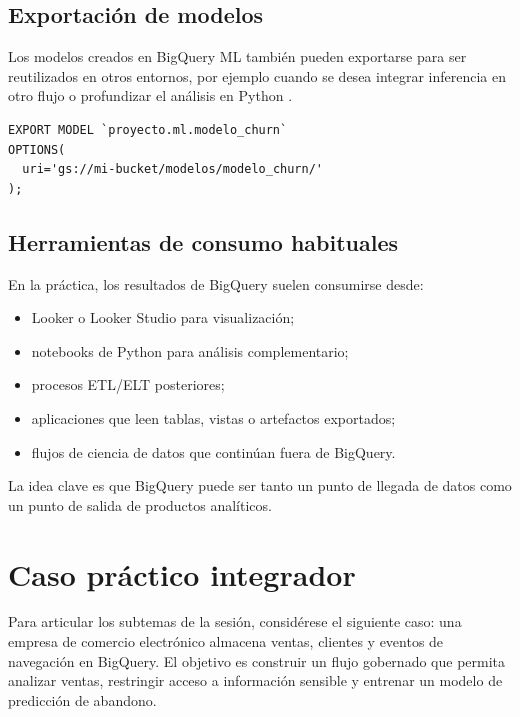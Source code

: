 \documentclass[12pt]{article}
\begin{document}
\subsection{Exportación de modelos}
Los modelos creados en BigQuery ML también pueden exportarse para ser reutilizados en otros entornos, por ejemplo cuando se desea integrar inferencia en otro flujo o profundizar el análisis en Python \cite{gcp_export_models,gcp_export_model_statement}.

\begin{lstlisting}[style=sql, caption={Exportación de un modelo BigQuery ML}]
EXPORT MODEL `proyecto.ml.modelo_churn`
OPTIONS(
  uri='gs://mi-bucket/modelos/modelo_churn/'
);
\end{lstlisting}

\subsection{Herramientas de consumo habituales}
En la práctica, los resultados de BigQuery suelen consumirse desde:

\begin{itemize}[leftmargin=*]
\item Looker o Looker Studio para visualización;
\item notebooks de Python para análisis complementario;
\item procesos ETL/ELT posteriores;
\item aplicaciones que leen tablas, vistas o artefactos exportados;
\item flujos de ciencia de datos que continúan fuera de BigQuery.
\end{itemize}

La idea clave es que BigQuery puede ser tanto un punto de llegada de datos como un punto de salida de productos analíticos.

\section{Caso práctico integrador}
Para articular los subtemas de la sesión, considérese el siguiente caso: una empresa de comercio electrónico almacena ventas, clientes y eventos de navegación en BigQuery. El objetivo es construir un flujo gobernado que permita analizar ventas, restringir acceso a información sensible y entrenar un modelo de predicción de abandono.
\end{document}

